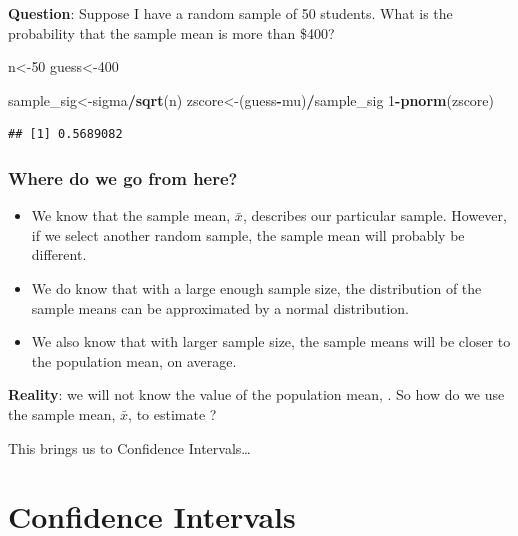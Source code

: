 \documentclass[
  openany]{book}
\newenvironment{Shaded}{\begin{snugshade}}{\end{snugshade}}
\newcommand{\DecValTok}[1]{\textcolor[rgb]{0.00,0.00,0.81}{#1}}
\newcommand{\FunctionTok}[1]{\textcolor[rgb]{0.13,0.29,0.53}{\textbf{#1}}}
\newcommand{\NormalTok}[1]{#1}
\newcommand{\OtherTok}[1]{\textcolor[rgb]{0.56,0.35,0.01}{#1}}
\newcommand{\SpecialCharTok}[1]{\textcolor[rgb]{0.81,0.36,0.00}{\textbf{#1}}}
\providecommand{\tightlist}{%
  \setlength{\itemsep}{0pt}\setlength{\parskip}{0pt}}
\begin{document}
\textbf{Question}: Suppose I have a random sample of 50 students. What is the probability that the sample mean is more than \$400?

\begin{Shaded}
\begin{Highlighting}[]
\NormalTok{n}\OtherTok{\textless{}{-}}\DecValTok{50}
\NormalTok{guess}\OtherTok{\textless{}{-}}\DecValTok{400}

\NormalTok{sample\_sig}\OtherTok{\textless{}{-}}\NormalTok{sigma}\SpecialCharTok{/}\FunctionTok{sqrt}\NormalTok{(n)}
\NormalTok{zscore}\OtherTok{\textless{}{-}}\NormalTok{(guess}\SpecialCharTok{{-}}\NormalTok{mu)}\SpecialCharTok{/}\NormalTok{sample\_sig}
\DecValTok{1}\SpecialCharTok{{-}}\FunctionTok{pnorm}\NormalTok{(zscore)}
\end{Highlighting}
\end{Shaded}

\begin{verbatim}
## [1] 0.5689082
\end{verbatim}

\subsubsection{Where do we go from here?}\label{where-do-we-go-from-here}

\begin{itemize}
\tightlist
\item
  We know that the sample mean, \(\bar{x}\), describes our particular sample. However, if we select another random sample, the sample mean will probably be different.
\item
  We do know that with a large enough sample size, the distribution of the sample means can be approximated by a normal distribution.
\item
  We also know that with larger sample size, the sample means will be closer to the population mean, on average.
\end{itemize}

\textbf{Reality}: we will not know the value of the population mean, \mu. So how do we use the sample mean, \(\bar{x}\), to estimate \mu?

This brings us to Confidence Intervals\ldots{}

\newpage

\section{Confidence Intervals}\label{confidence-intervals}
\end{document}
